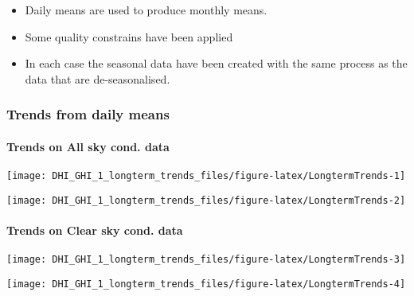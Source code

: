 \documentclass[
  10pt,
  a4paper,oneside]{article}
\providecommand{\tightlist}{%
  \setlength{\itemsep}{0pt}\setlength{\parskip}{0pt}}
\begin{document}
\begin{itemize}
\tightlist
\item
  Daily means are used to produce monthly means.
\item
  Some quality constrains have been applied
\item
  In each case the seasonal data have been created with the same process as
  the data that are de-seasonalised.
\end{itemize}

\newpage
\FloatBarrier

\hypertarget{trends-from-daily-means}{%
\subsubsection{Trends from daily means}\label{trends-from-daily-means}}

\newpage

\hypertarget{trends-on-all-sky-cond.-data}{%
\paragraph{Trends on All sky cond. data}\label{trends-on-all-sky-cond.-data}}

\begin{center}\texttt{[image: DHI\_GHI\_1\_longterm\_trends\_files/figure-latex/LongtermTrends-1]} \end{center}

\begin{center}\texttt{[image: DHI\_GHI\_1\_longterm\_trends\_files/figure-latex/LongtermTrends-2]} \end{center}

\newpage

\hypertarget{trends-on-clear-sky-cond.-data}{%
\paragraph{Trends on Clear sky cond. data}\label{trends-on-clear-sky-cond.-data}}

\begin{center}\texttt{[image: DHI\_GHI\_1\_longterm\_trends\_files/figure-latex/LongtermTrends-3]} \end{center}

\begin{center}\texttt{[image: DHI\_GHI\_1\_longterm\_trends\_files/figure-latex/LongtermTrends-4]} \end{center}
\end{document}
